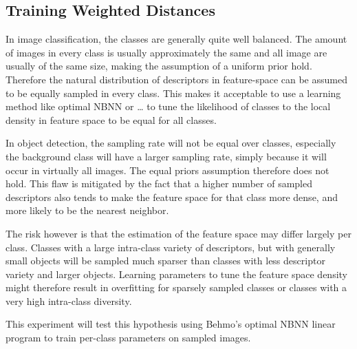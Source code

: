 
\begin{figure}[hbt]
    \centering
\end{figure}


\subsection{Training Weighted Distances} %
\label{sec:training_weighted_distances}

In image classification, the classes are generally quite well balanced. The amount of images in every class is usually approximately the same and all image are usually of the same size, making the assumption of a uniform prior hold. Therefore the natural distribution of descriptors in feature-space can be assumed to be equally sampled in every class. This makes it acceptable to use a learning method like optimal NBNN\cite{behmo2010towards} or \ldots {}\cite{wang2011improved} to tune the likelihood of classes to the local density in feature space to be equal for all classes.

In object detection, the sampling rate will not be equal over classes, especially the background class will have a larger sampling rate, simply because it will occur in virtually all images. The equal priors assumption therefore does not hold. This flaw is mitigated by the fact that a higher number of sampled descriptors also tends to make the feature space for that class more dense, and more likely to be the nearest neighbor.

The risk however is that the estimation of the feature space may differ largely per class. Classes with a large intra-class variety of descriptors, but with generally small objects will be sampled much sparser than classes with less descriptor variety and larger objects. Learning parameters to tune the feature space density might therefore result in overfitting for sparsely sampled classes or classes with a very high intra-class diversity.

This experiment will test this hypothesis using Behmo's optimal NBNN linear program to train per-class parameters on sampled images.


\begin{figure}[hbt]
    \centering
\end{figure}


